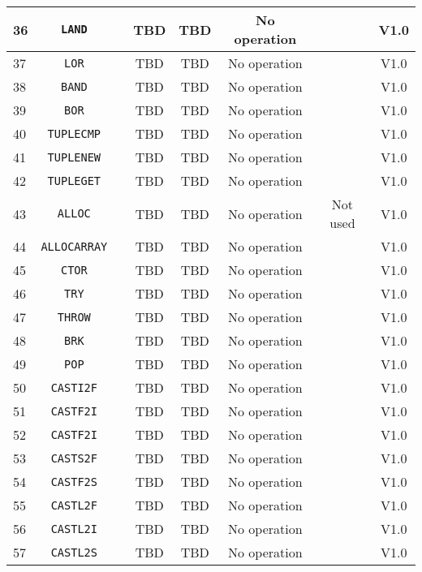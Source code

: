 \documentclass{article}
\begin{document}
\begin{longtable}{|l|c|c|c|c|c|c|c|}
		36 & \texttt{LAND} & & TBD & TBD & No operation & & \textsf{V1.0} \\ \hline
		37 & \texttt{LOR} & & TBD & TBD & No operation & & \textsf{V1.0} \\ \hline
		38 & \texttt{BAND} & & TBD & TBD & No operation & & \textsf{V1.0} \\ \hline
		39 & \texttt{BOR} & & TBD & TBD & No operation & & \textsf{V1.0} \\ \hline
		40 & \texttt{TUPLECMP} & & TBD & TBD & No operation & & \textsf{V1.0} \\ \hline
		41 & \texttt{TUPLENEW} & & TBD & TBD & No operation & & \textsf{V1.0} \\ \hline
		42 & \texttt{TUPLEGET} & & TBD & TBD & No operation & & \textsf{V1.0} \\ \hline
		43 & \texttt{ALLOC} & & TBD & TBD & No operation & Not used & \textsf{V1.0} \\ \hline
		44 & \texttt{ALLOCARRAY} & & TBD & TBD & No operation & & \textsf{V1.0} \\ \hline
		45 & \texttt{CTOR} & & TBD & TBD & No operation & & \textsf{V1.0} \\ \hline
		46 & \texttt{TRY} & & TBD & TBD & No operation & & \textsf{V1.0} \\ \hline
		47 & \texttt{THROW} & & TBD & TBD & No operation & & \textsf{V1.0} \\ \hline
		48 & \texttt{BRK} & & TBD & TBD & No operation & & \textsf{V1.0} \\ \hline
		49 & \texttt{POP} & & TBD & TBD & No operation & & \textsf{V1.0} \\ \hline
		50 & \texttt{CASTI2F} & & TBD & TBD & No operation & & \textsf{V1.0} \\ \hline
		51 & \texttt{CASTF2I} & & TBD & TBD & No operation & & \textsf{V1.0} \\ \hline
		52 & \texttt{CASTF2I} & & TBD & TBD & No operation & & \textsf{V1.0} \\ \hline
		53 & \texttt{CASTS2F} & & TBD & TBD & No operation & & \textsf{V1.0} \\ \hline
		54 & \texttt{CASTF2S} & & TBD & TBD & No operation & & \textsf{V1.0} \\ \hline
		55 & \texttt{CASTL2F} & & TBD & TBD & No operation & & \textsf{V1.0} \\ \hline
		56 & \texttt{CASTL2I} & & TBD & TBD & No operation & & \textsf{V1.0} \\ \hline
		57 & \texttt{CASTL2S} & & TBD & TBD & No operation & & \textsf{V1.0} \\ \hline

\end{longtable}
\end{document}
